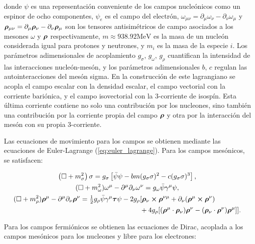 donde $\psi$ es una representación conveniente de los campos nucleónicos como un espinor de ocho componentes, $\psi_e$ es el campo del electrón, $\omega_{\mu\nu} = \partial_\mu \omega_\nu - \partial_\nu \omega_\mu$ y $\boldsymbol{\rho}_{\mu\nu} = \partial_\mu \boldsymbol{\rho}_\nu - \partial_\nu \boldsymbol{\rho}_\mu$ son los tensores antisimétricos de campo asociados a los mesones $\omega$ y $\boldsymbol{\rho}$ respectivamente, $m \approx 938.92 \text{MeV}$ es la masa de un nucleón considerada igual para protones y neutrones, y $m_i$ es la masa de la especie $i$. Los parámetros adimensionales de acoplamiento $g_{\sigma}$, $g_{\omega}$, $g_{\rho}$ cuantifican la intensidad de las interacciones nucleón-mesón, y los parámetros adimensionales $b$, $c$ regulan las autointeracciones del mesón sigma. En la construcción de este lagrangiano se acopla el campo escalar con la densidad escalar, el campo vectorial con la corriente bariónica, y el campo isovectorial con la 3-corriente de isospín. Esta última corriente contiene no solo una contribución por los nucleones, sino también una contribución por la corriente propia del campo $\boldsymbol{\rho}$ y otra por la interacción del mesón con su propia 3-corriente.

Las ecuaciones de movimiento para los campos se obtienen mediante las ecuaciones de Euler-Lagrange (\ref{eq:euler_lagrange}). Para los campos mesónicos, se satisfacen:

\begin{gather}
	\left(\square + m_\sigma^2\right) \sigma = g_\sigma\left[\bar{\psi} \psi - bm(g_\sigma\sigma)^2 - c(g_\sigma\sigma)^3\right], \label{eq:eom_sigma_full} \\
	(\square + m_\omega^2) \omega^\mu - \partial^\mu \partial_\nu \omega^\nu = g_{\omega} \bar{\psi} \gamma^\mu \psi, \label{eq:eom_omega_full} \\
	\begin{aligned}
		(\square + m_\rho^2) \boldsymbol{\rho}^\mu - \partial^\mu \partial_\nu \boldsymbol{\rho}^\nu = \tfrac{1}{2} g_{\rho} \bar{\psi} \gamma^\mu \boldsymbol{\tau} \psi - 2g_\rho&[\boldsymbol{\rho}_\nu \cross \boldsymbol{\rho}^{\nu\mu} + \partial_\nu(\boldsymbol{\rho}^\mu \cross \boldsymbol{\rho}^\nu) \\ 
		&+ 4g_\rho[(\boldsymbol{\rho}^\mu \cdot \boldsymbol{\rho}_\nu)\boldsymbol{\rho}^\nu - (\boldsymbol{\rho}_\nu \cdot \boldsymbol{\rho}^\nu)\boldsymbol{\rho}^\mu]]. \label{eq:eom_rho_full}
	\end{aligned}
\end{gather}

Para los campos fermiónicos se obtienen las ecuaciones de Dirac, acoplada a los campos mesónicos para los nucleones y libre para los electrones:

